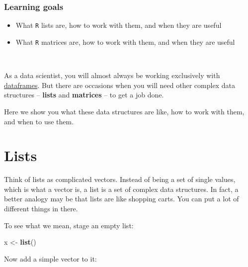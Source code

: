 \documentclass[
]{book}
\newenvironment{Shaded}{\begin{snugshade}}{\end{snugshade}}
\newcommand{\DecValTok}[1]{\textcolor[rgb]{0.00,0.00,0.81}{#1}}
\newcommand{\KeywordTok}[1]{\textcolor[rgb]{0.13,0.29,0.53}{\textbf{#1}}}
\newcommand{\NormalTok}[1]{#1}
\newcommand{\OperatorTok}[1]{\textcolor[rgb]{0.81,0.36,0.00}{\textbf{#1}}}
\newcommand{\StringTok}[1]{\textcolor[rgb]{0.31,0.60,0.02}{#1}}
\providecommand{\tightlist}{%
  \setlength{\itemsep}{0pt}\setlength{\parskip}{0pt}}
\begin{document}
\hypertarget{learning-goals-20}{%
\subsubsection*{Learning goals}\label{learning-goals-20}}

\begin{itemize}
\tightlist
\item
  What \texttt{R} lists are, how to work with them, and when they are useful\\
\item
  What \texttt{R} matrices are, how to work with them, and when they are useful
\end{itemize}

~

As a data scientist, you will almost always be working exclusively with \protect\hyperlink{dataframes}{dataframes}. But there are occasions when you will need other complex data structures -- \textbf{lists} and \textbf{matrices} -- to get a job done.

Here we show you what these data structures are like, how to work with them, and when to use them.

\hypertarget{lists}{%
\section*{Lists}\label{lists}}

Think of lists as complicated vectors. Instead of being a set of single values, which is what a vector is, a list is a set of complex data structures. In fact, a better analogy may be that lists are like shopping carts. You can put a lot of different things in there.

To see what we mean, stage an empty list:

\begin{Shaded}
\begin{Highlighting}[]
\NormalTok{x <-}\StringTok{ }\KeywordTok{list}\NormalTok{()}
\end{Highlighting}
\end{Shaded}

Now add a simple vector to it:

\begin{Shaded}
\end{Shaded}
\end{document}
